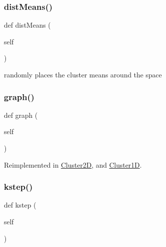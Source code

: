 \mbox{\label{classdynamicfilterapp_1_1simulation__files_1_1cluster_1_1_clusterk_d_a31c920858c820e0e7738c0d5aa3310bb}} 
\subsubsection{\texorpdfstring{distMeans()}{distMeans()}}
{\footnotesize\ttfamily def dist\+Means (\begin{DoxyParamCaption}\item[{}]{self }\end{DoxyParamCaption})}

\begin{DoxyVerb}randomly places the cluster means around the space
\end{DoxyVerb}
 \mbox{\label{classdynamicfilterapp_1_1simulation__files_1_1cluster_1_1_clusterk_d_a32122ca5e18d511dacbccf1be6e60dbd}} 
\subsubsection{\texorpdfstring{graph()}{graph()}}
{\footnotesize\ttfamily def graph (\begin{DoxyParamCaption}\item[{}]{self }\end{DoxyParamCaption})}



Reimplemented in \mbox{\hyperlink{classdynamicfilterapp_1_1simulation__files_1_1cluster_1_1_cluster2_d_a32122ca5e18d511dacbccf1be6e60dbd}{Cluster2D}}, and \mbox{\hyperlink{classdynamicfilterapp_1_1simulation__files_1_1cluster_1_1_cluster1_d_a32122ca5e18d511dacbccf1be6e60dbd}{Cluster1D}}.

\mbox{\label{classdynamicfilterapp_1_1simulation__files_1_1cluster_1_1_clusterk_d_afd59dc7334ea7c25447dafe9a5241491}} 
\subsubsection{\texorpdfstring{kstep()}{kstep()}}
{\footnotesize\ttfamily def kstep (\begin{DoxyParamCaption}\item[{}]{self }\end{DoxyParamCaption})}

